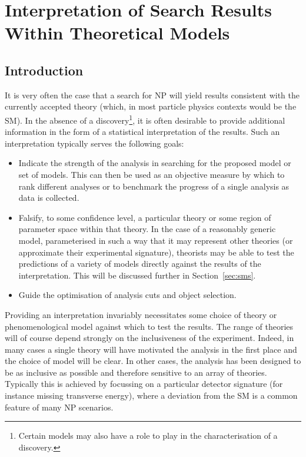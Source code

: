 \chapter{Interpretation of Search Results Within Theoretical Models}
\label{sec:interpretation}
\section{Introduction}
It is very often the case that a search for \ac{NP} will yield results
consistent with the currently accepted theory (which, in most particle physics
contexts would be the \ac{SM}). In the absence of a discovery\footnote{Certain
  models may also have a role to play in the characterisation of a discovery.},
it is often desirable to provide additional information in the form of a
statistical interpretation of the results. Such an interpretation typically
serves the following goals:
\begin{itemize}
\item Indicate the strength of the analysis in searching for the proposed model
  or set of models. This can then be used as an objective measure by which to
  rank different analyses or to benchmark the progress of a single analysis as
  data is collected.
\item Falsify, to some confidence level, a particular theory or some region of
  parameter space within that theory. In the case of a reasonably generic model,
  parameterised in such a way that it may represent other theories (or
  approximate their experimental signature), theorists may be able to
  test the predictions of a variety of models directly against the results of
  the interpretation. This will be discussed further in Section~\ref{sec:sms}.
\item Guide the optimisation of analysis cuts and object selection.
\end{itemize}

Providing an interpretation invariably necessitates some choice of theory or
phenomenological model against which to test the results. The range of theories
will of course depend strongly on the inclusiveness of the experiment. Indeed,
in many cases a single theory will have motivated the analysis in the first
place and the choice of model will be clear. In other cases, the analysis has
been designed to be as inclusive as possible and therefore sensitive to an array
of theories. Typically this is achieved by focussing on a particular detector
signature (for instance missing transverse energy), where a deviation from the
\ac{SM} is a common feature of many \ac{NP} scenarios.

